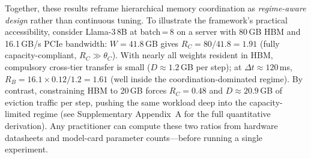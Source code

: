 Together, these results reframe hierarchical memory coordination as
\emph{regime-aware design} rather than continuous tuning.
To illustrate the framework's practical accessibility, consider Llama-3\,8B at
batch\,=\,8 on a server with 80\,GB HBM and 16.1\,GB/s PCIe bandwidth:
$W = 41.8$\,GB gives $R_C = 80/41.8 = 1.91$ (fully capacity-compliant,
$R_C \gg \theta_C$).
With nearly all weights resident in HBM, compulsory cross-tier transfer is
small ($D \approx 1.2$\,GB per step); at $\Delta t \approx 120$\,ms,
$R_B = 16.1 \times 0.12 / 1.2 = 1.61$ (well inside the coordination-dominated
regime).
By contrast, constraining HBM to 20\,GB forces $R_C = 0.48$ and
$D \approx 20.9$\,GB of eviction traffic per step, pushing the same workload
deep into the capacity-limited regime (see Supplementary Appendix~A for the
full quantitative derivation).
Any practitioner can compute these two ratios from hardware datasheets and
model-card parameter counts---before running a single experiment.

\FloatBarrier
